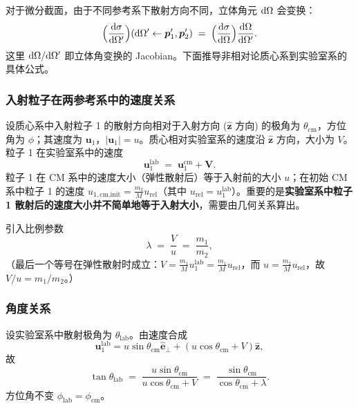 对于微分截面，由于不同参考系下散射方向不同，立体角元 $\mathrm{d}\Omega$ 会变换：
\begin{equation}
  \Big(\frac{\mathrm{d}\sigma}{\mathrm{d}\Omega'}\Big)(\mathrm{d}\Omega'\leftarrow \bm{p}_1',\bm{p}_2')
  \;=\; \Big(\frac{\mathrm{d}\sigma}{\mathrm{d}\Omega}\Big)\frac{\mathrm{d}\Omega}{\mathrm{d}\Omega'}.
  \label{eq:diff-cs-jacobian}
\end{equation}
这里 $\mathrm{d}\Omega/\mathrm{d}\Omega'$ 即立体角变换的 Jacobian。下面推导非相对论质心系到实验室系的具体公式。

\subsubsection*{入射粒子在两参考系中的速度关系}

设质心系中入射粒子 1 的散射方向相对于入射方向 ($\hat{\bm{z}}$ 方向) 的极角为 $\theta_{\text{cm}}$，方位角为 $\phi$；其速度为 $\bm{u}_1$，$|\bm{u}_1|=u$。质心相对实验室系的速度沿 $\hat{\bm{z}}$ 方向，大小为 $V$。粒子 1 在实验室系中的速度
\begin{equation}
  \bm{u}_1^{\text{lab}} \;=\; \bm{u}_1^{\text{cm}} + \bm{V}.
\end{equation}
粒子 1 在 CM 系中的速度大小（弹性散射后）等于入射前的大小 $u$；在初始 CM 系中粒子 1 的速度 $u_{1,\text{cm,init}}=\frac{m_2}{M}u_{\text{rel}}$（其中 $u_{\text{rel}}=u_1^{\text{lab}}$）。重要的是\textbf{实验室系中粒子 1 散射后的速度大小并不简单地等于入射大小}，需要由几何关系算出。

引入比例参数
\begin{equation}
  \lambda \;=\; \frac{V}{u} \;=\; \frac{m_1}{m_2},
  \label{eq:lambda-def}
\end{equation}
（最后一个等号在弹性散射时成立：$V=\frac{m_1}{M}u_1^{\text{lab}}=\frac{m_1}{M}u_{\text{rel}}$，而 $u=\frac{m_2}{M}u_{\text{rel}}$，故 $V/u=m_1/m_2$。）

\subsubsection*{角度关系}

设实验室系中散射极角为 $\theta_{\text{lab}}$。由速度合成
\[
  \bm{u}_1^{\text{lab}} = u\sin\theta_{\text{cm}}\hat{\bm{e}}_{\perp} + (u\cos\theta_{\text{cm}}+V)\hat{\bm{z}},
\]
故
\begin{equation}
  \tan\theta_{\text{lab}} \;=\; \frac{u\sin\theta_{\text{cm}}}{u\cos\theta_{\text{cm}}+V}
  \;=\; \frac{\sin\theta_{\text{cm}}}{\cos\theta_{\text{cm}}+\lambda}.
  \label{eq:theta-lab-cm}
\end{equation}
方位角不变 $\phi_{\text{lab}}=\phi_{\text{cm}}$。

